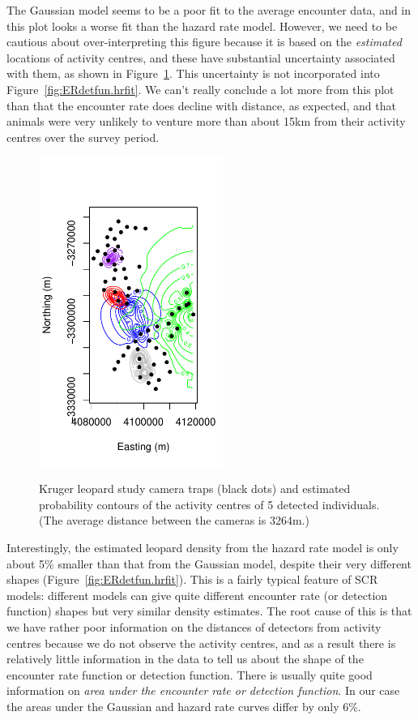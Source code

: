 \documentclass[graybox,envcountchap,sectrefs]{SpringerStyleFiles/styles/svmono}\usepackage[]{graphicx}\usepackage[]{color}
\begin{document}
The Gaussian model seems to be a  poor fit to the average encounter data, and in this plot looks a  worse fit than the hazard rate model. However, we need to be cautious about over-interpreting this figure because it is based on the \textit{estimated} locations of activity centres, and these have substantial uncertainty associated with them, as shown in Figure~\ref{fig:ERdetfun-locest}. This uncertainty is not incorporated into Figure~\ref{fig:ERdetfun.hrfit}. We can't really conclude a lot more from this plot than that the encounter rate does decline with distance, as expected, and that animals were very unlikely to venture more than about 15km from their activity centres over the survey period.

\begin{figure}[ht]
\caption{\small Kruger leopard study camera traps (black dots) and estimated probability contours of the activity centres of 5 detected individuals. (The average distance between the cameras is 3264m.)}
\centering
\vspace{-24pt}
\includegraphics[width=6cm]{keepfigure/ERdetfun-locest.pdf}
\label{fig:ERdetfun-locest}
\end{figure}

Interestingly, the estimated leopard density from the hazard rate model is only about 5\% smaller than that from the Gaussian model, despite their very different shapes (Figure~\ref{fig:ERdetfun.hrfit}). This is a fairly typical feature of SCR models: different models can give quite different encounter rate (or detection function) shapes but very similar density estimates. The root cause of this is that  we have rather poor information on the distances of detectors from activity centres because we do not observe the activity centres, and as a result there is relatively little information in the data to tell us about the shape of the encounter rate function or detection function. There is usually quite good information on \textit{area under the encounter rate or detection function}. In our case the areas under the Gaussian and hazard rate curves differ by only 6\%. 
\end{document}
